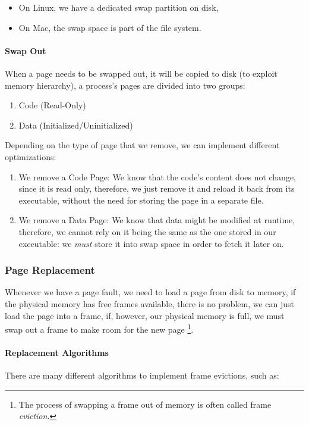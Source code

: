 \documentclass[openright, twoside]{report}
\theoremstyle{definition}
\theoremstyle{example}
\begin{document}
\begin{itemize}
	\item On Linux, we have a dedicated swap partition on disk,
	\item On Mac, the swap space is part of the file system.
\end{itemize}

\paragraph{Swap Out}
When a page needs to be swapped out, it will be copied to disk (to exploit 
memory hierarchy), a process's pages are divided into two groups:
\begin{enumerate}
	\item Code (Read-Only)
	\item Data (Initialized/Uninitialized)
\end{enumerate}

Depending on the type of page that we remove, we can implement different optimizations:
\begin{enumerate}
	\item We remove a Code Page:
	We know that the code's content does not change, since it is read only, therefore, 
	we just remove it and reload it back from its executable, without the need for storing the 
	page in a separate file.
	\item We remove a Data Page:
	We know that data might be modified at runtime, therefore, we cannot rely on it being the 
	same as the one stored in our executable: we \emph{must} store it into swap space 
	in order to fetch it later on.
\end{enumerate}

\subsubsection{Page Replacement}
Whenever we have a page fault, we need to load a page from disk to memory, if 
the physical memory has free frames available, there is no problem, we can just load 
the page into a frame, if, however, our physical memory is full, we must swap out a frame
to make room for the new page \footnote{The process of swapping a frame out of memory 
is often called frame \emph{eviction}.}.

\paragraph{Replacement Algorithms}
There are many different algorithms to implement frame evictions, such as:
\end{document}

